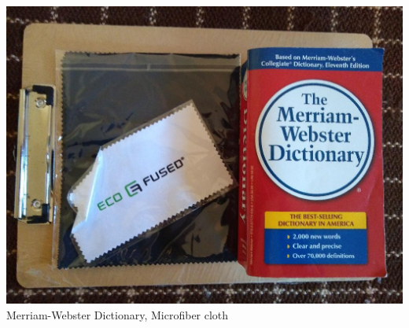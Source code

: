 \documentclass[t]{beamer}
\newcommand{\htarget}[2]{\hypertarget{#1}{#2}}
\begin{document}
\begin{frame}\htarget{merriam}{} \begin{center}
\includegraphics[height=0.8\textheight]{dictionary_microfibre_cloth_mini.jpg} \\
Merriam-Webster Dictionary, Microfiber cloth
\end{center} \end{frame}
\end{document}
